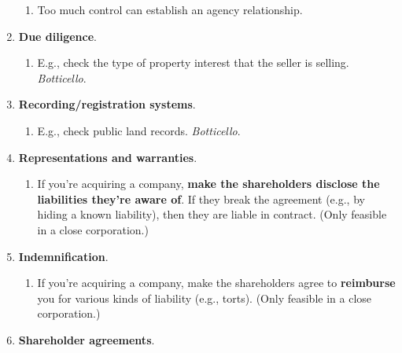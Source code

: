 \begin{enumerate}
\begin{enumerate}
        \item Too much control can establish an agency relationship. 
    \end{enumerate}
    \item \textbf{Due diligence}.
    \begin{enumerate}
        \item E.g., check the type of property interest that the seller is 
        selling.  \emph{Botticello}.
    \end{enumerate}
    \item \textbf{Recording/registration systems}.
    \begin{enumerate}
        \item E.g., check public land records. \emph{Botticello}.
    \end{enumerate}
    \item \textbf{Representations and warranties}.
    \begin{enumerate}
        \item If you're acquiring a company, \textbf{make the shareholders 
        disclose the liabilities they're aware of}. If they break the 
        agreement (e.g., by hiding a known liability), then they are liable in 
        contract. (Only feasible in a close corporation.)
    \end{enumerate}
    \item \textbf{Indemnification}.
    \begin{enumerate}
        \item If you're acquiring a company, make the shareholders agree to 
        \textbf{reimburse} you for various kinds of liability (e.g., torts). 
        (Only feasible in a close corporation.)
    \end{enumerate}
    \item \textbf{Shareholder agreements}.
\end{enumerate}

